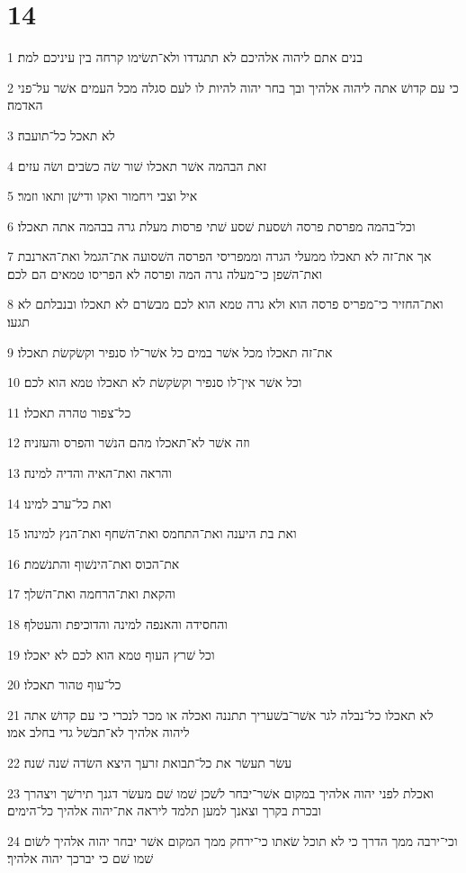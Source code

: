 \chapter{14}

\par 1 בנים אתם ליהוה אלהיכם לא תתגדדו ולא־תשׂימו קרחה בין עיניכם למת׃
\par 2 כי עם קדושׁ אתה ליהוה אלהיך ובך בחר יהוה להיות לו לעם סגלה מכל העמים אשׁר על־פני האדמה׃
\par 3 לא תאכל כל־תועבה׃
\par 4 זאת הבהמה אשׁר תאכלו שׁור שׂה כשׂבים ושׂה עזים׃
\par 5 איל וצבי ויחמור ואקו ודישׁן ותאו וזמר׃
\par 6 וכל־בהמה מפרסת פרסה ושׁסעת שׁסע שׁתי פרסות מעלת גרה בבהמה אתה תאכלו׃
\par 7 אך את־זה לא תאכלו ממעלי הגרה וממפריסי הפרסה השׁסועה את־הגמל ואת־הארנבת ואת־השׁפן כי־מעלה גרה המה ופרסה לא הפריסו טמאים הם לכם׃
\par 8 ואת־החזיר כי־מפריס פרסה הוא ולא גרה טמא הוא לכם מבשׂרם לא תאכלו ובנבלתם לא תגעו׃
\par 9 את־זה תאכלו מכל אשׁר במים כל אשׁר־לו סנפיר וקשׂקשׂת תאכלו׃
\par 10 וכל אשׁר אין־לו סנפיר וקשׂקשׂת לא תאכלו טמא הוא לכם׃
\par 11 כל־צפור טהרה תאכלו׃
\par 12 וזה אשׁר לא־תאכלו מהם הנשׁר והפרס והעזניה׃
\par 13 והראה ואת־האיה והדיה למינה׃
\par 14 ואת כל־ערב למינו׃
\par 15 ואת בת היענה ואת־התחמס ואת־השׁחף ואת־הנץ למינהו׃
\par 16 את־הכוס ואת־הינשׁוף והתנשׁמת׃
\par 17 והקאת ואת־הרחמה ואת־השׁלך׃
\par 18 והחסידה והאנפה למינה והדוכיפת והעטלף׃
\par 19 וכל שׁרץ העוף טמא הוא לכם לא יאכלו׃
\par 20 כל־עוף טהור תאכלו׃
\par 21 לא תאכלו כל־נבלה לגר אשׁר־בשׁעריך תתננה ואכלה או מכר לנכרי כי עם קדושׁ אתה ליהוה אלהיך לא־תבשׁל גדי בחלב אמו׃
\par 22 עשׂר תעשׂר את כל־תבואת זרעך היצא השׂדה שׁנה שׁנה׃
\par 23 ואכלת לפני יהוה אלהיך במקום אשׁר־יבחר לשׁכן שׁמו שׁם מעשׂר דגנך תירשׁך ויצהרך ובכרת בקרך וצאנך למען תלמד ליראה את־יהוה אלהיך כל־הימים׃
\par 24 וכי־ירבה ממך הדרך כי לא תוכל שׂאתו כי־ירחק ממך המקום אשׁר יבחר יהוה אלהיך לשׂום שׁמו שׁם כי יברכך יהוה אלהיך׃
